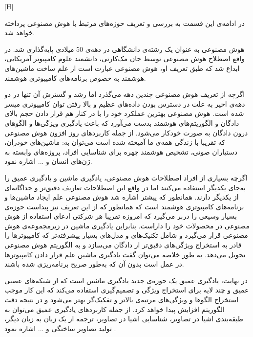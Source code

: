 [H]

در ادامه‌ی این قسمت به بررسی و تعریف حوزه‌های مرتبط با هوش مصنوعی پرداخته خواهد شد.

هوش مصنوعی به عنوان یک رشته‌ی دانشگاهی در دهه‌ی 50 میلادی پایه‌گذاری شد. در واقع اصطلاح هوش مصنوعی توسط جان مک‌کارتی، دانشمند علوم کامپیوتر آمریکایی، ابداع شد که طبق تعریف او، هوش مصنوعی عبارت است از علم ساخت ماشین‌های هوشمند به خصوص برنامه‌های کامپیوتری هوشمند.

اگرچه از تعریف هوش مصنوعی چندین دهه می‌گذرد اما رشد و گسترش آن تنها در دو دهه‌ی اخیر به علت در دسترس بودن داده‌های عظیم و بالا رفتن توان کامپیوتری میسر شده است. هوش مصنوعی بهترین عملکرد خود را با در کنار هم قرار دادن حجم بالای دادگان و الگوریتم‌های هوشمند بدست می‌آورد که باعث یادگیری ویژگی‌ها و الگوهای درون دادگان به صورت خودکار می‌شود. از جمله کاربردهای روز افزون هوش مصنوعی که تقریبا با زندگی همه‌ی ما آمیخته شده است می‌توان به: ماشین‌های خودران، دستیاران صوتی، تشخیص هوشمند چهره برای شناسایی افراد، پروژه‌های وابسته به ژن‌های انسان و ... اشاره نمود.

اگرچه بسیاری از افراد اصطلاحات هوش مصنوعی، یادگیری ماشین و یادگیری عمیق را به‌جای یکدیگر استفاده می‌کنند اما در واقع این اصطلاحات تعاریف دقیق‌تر و جداگانه‌ای از یکدیگر دارند. همانطور که پیشتر اشاره شد هوش مصنوعی علم ایجاد ماشین‌ها و برنامه‌های کامپیوتری هوشمند است که همانطور که از این تعریف نیز پیداست حوزه‌ی بسیار وسیعی را دربر می‌گیرد که امروزه تقریبا هر شرکتی ادعای استفاده از هوش مصنوعی در محصولات خود را داراست. بنابراین یادگیری ماشین در زیرمجموعه‌ی هوش مصنوعی قرار می‌گیرد و شامل تکنیک‌های و مدل‌های بسیار پیشرفته‌تر که کامپیوترها را قادر به استخراج ویژگی‌های دقیق‌تر از دادگان می‌سازد و به الگوریتم هوش مصنوعی تحویل می‌دهد. به طور خلاصه می‌توان گفت یادگیری ماشین علم قرار دادن کامپیوترها در عمل است بدون آن که به‌طور صریح برنامه‌ریزی شده باشند.

در نهایت، یادگیری عمیق یک حوزه‌ی جدید یادگیری ماشین است که از شبکه‌های عصبی عمیق و چند لایه برای استخراج ویژگی و تصمیم‌گیری استفاده می‌کند که این کار موجب استخراج الگوها و ویژگی‌های مرتبه‌ی بالاتر و تفکیک‌گر بهتر می‌شود و در نتیجه دقت الگوریتم افزایش پیدا خواهد کرد. از جمله کاربرد‌های یادگیری عمیق می‌توان به طبقه‌بندی اشیا در تصاویر، شناسایی اشیا در تصاویر، ترجمه از یک زبان به زبان دیگر، تولید تصاویر ساختگی و ... اشاره نمود . 

